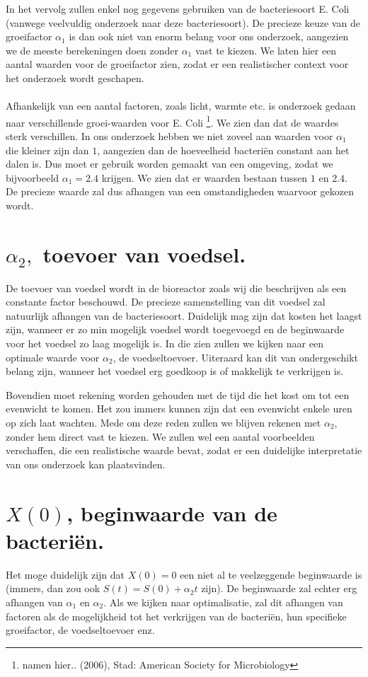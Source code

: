 In het vervolg zullen enkel nog gegevens gebruiken van de bacteriesoort E. Coli (vanwege veelvuldig onderzoek naar deze bacteriesoort). De precieze keuze van de groeifactor $\alpha_1$ is dan ook niet van enorm belang voor ons onderzoek, aangezien we de meeste berekeningen doen zonder $\alpha_1$ vast te kiezen. We laten hier een aantal waarden voor de groeifactor zien, zodat er een realistischer context voor het onderzoek wordt geschapen. 
\\
\\
Afhankelijk van een aantal factoren, zoals licht, warmte etc. is onderzoek gedaan naar verschillende groei-waarden voor E. Coli \footnote{namen hier.. (2006), Stad: American Society for Microbiology}. We zien dan dat de waardes sterk verschillen. In ons onderzoek hebben we niet zoveel aan waarden voor $\alpha_1$ die kleiner zijn dan $1$, aangezien dan de hoeveelheid bacteri\"en constant aan het dalen is. Dus moet er gebruik worden gemaakt van een omgeving, zodat we bijvoorbeeld $\alpha_1 = 2.4$ krijgen. We zien dat er waarden bestaan tussen $1$ en $2.4$. De precieze waarde zal dus afhangen van een omstandigheden waarvoor gekozen wordt.


\section{$\alpha_2,$ toevoer van voedsel.}
De toevoer van voedsel wordt in de bioreactor zoals wij die beschrijven als een constante factor beschouwd. De precieze samenstelling van dit voedsel zal natuurlijk afhangen van de bacteriesoort. Duidelijk mag zijn dat kosten het laagst zijn, wanneer er zo min mogelijk voedsel wordt toegevoegd en de beginwaarde voor het voedsel zo laag mogelijk is. In die zien zullen we kijken naar een optimale waarde voor $\alpha_2$, de voedseltoevoer. Uiteraard kan dit van ondergeschikt belang zijn, wanneer het voedsel erg goedkoop is of makkelijk te verkrijgen is. 

Bovendien moet rekening worden gehouden met de tijd die het kost om tot een evenwicht te komen. Het zou immers kunnen zijn dat een evenwicht enkele uren op zich laat wachten. Mede om deze reden zullen we blijven rekenen met $\alpha_2$, zonder hem direct vast te kiezen. We zullen wel een aantal voorbeelden verschaffen, die een realistische waarde bevat, zodat er een duidelijke interpretatie van ons onderzoek kan plaatsvinden. 


\section{$X(0)$, beginwaarde van de bacteri\"en.}
Het moge duidelijk zijn dat $X(0) = 0$ een niet al te veelzeggende beginwaarde is (immers, dan zou ook $S(t) = S(0) + \alpha_2 t$ zijn). De beginwaarde zal echter erg afhangen van $\alpha_1$ en $\alpha_2$. Als we kijken naar optimalisatie, zal dit afhangen van factoren als de mogelijkheid tot het verkrijgen van de bacteri\"en, hun specifieke groeifactor, de voedseltoevoer enz.  













